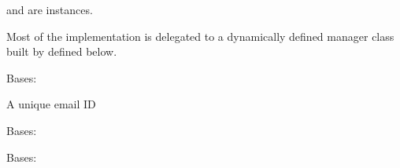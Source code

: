 \documentclass[letterpaper,10pt,english]{sphinxmanual}
\begin{document}
\begin{fulllineitems}
\begin{fulllineitems}
 and  are 
instances.

Most of the implementation is delegated to a dynamically defined manager
class built by  defined below.

\end{fulllineitems}


\begin{fulllineitems}
\label{push_email:push_email.models.Copy.objects}
\end{fulllineitems}


\end{fulllineitems}


\begin{fulllineitems}
\label{push_email:push_email.models.EmailId}
Bases: 

A unique email ID

\begin{fulllineitems}
\label{push_email:push_email.models.EmailId.DoesNotExist}
Bases: 

\end{fulllineitems}


\begin{fulllineitems}
\label{push_email:push_email.models.EmailId.MultipleObjectsReturned}
Bases: 

\end{fulllineitems}


\begin{fulllineitems}
\label{push_email:push_email.models.EmailId.objects}
\end{fulllineitems}


\end{fulllineitems}
\end{document}
